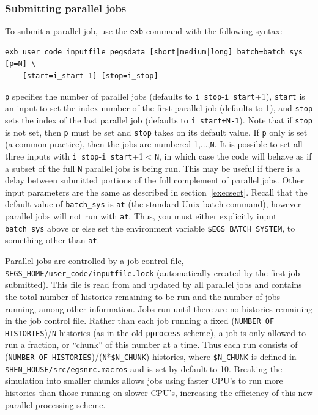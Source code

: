 \documentclass[12pt,twoside]{article}  %
\begin{document}
\subsubsection{Submitting parallel jobs}
\label{subparsect}
To submit a parallel job, use the {\tt exb} command with the following
syntax:
\begin{verbatim}
exb user_code inputfile pegsdata [short|medium|long] batch=batch_sys [p=N] \
    [start=i_start-1] [stop=i_stop]
\end{verbatim}
{\tt p} specifies the number of parallel jobs (defaults to
{\tt i\_stop}-{\tt i\_start}+1), {\tt start} is an input
to set the index number of the
first parallel job (defaults to 1), and {\tt stop} sets the index of the
last parallel
job (defaults to {\tt i\_start+N-1}).  Note that if {\tt stop} is not set,
then {\tt p} must be set and {\tt stop} takes on its default value.  If
{\tt p} only is set (a common practice), then the jobs are numbered
1,...,{\tt N}.  It is possible to set all three inputs with
{\tt i\_stop}-{\tt i\_start}+1$<${\tt N}, in which case the code will
behave as if a subset of the full {\tt N} parallel jobs is being
run.  This may be useful if there is a delay between submitted portions
of the full complement of parallel jobs.
Other input parameters are the same as described in section~\ref{execsect}.
Recall that the default value of {\tt batch\_sys} is {\tt at} (the
standard Unix batch command), however parallel jobs will not run with
{\tt at}.  Thus, you must either explicitly input {\tt batch\_sys} above
or else set the environment variable {\tt \$EGS\_BATCH\_SYSTEM},
to something other than {\tt at}.

Parallel jobs
are controlled by a job control file,
{\tt \$EGS\_HOME/user\_code/inputfile.lock}
(automatically created by the first job submitted).  This file is read from and
updated by all parallel jobs and contains the total number of histories
remaining to be run and the number of jobs running, among other information.
Jobs run until there are no histories remaining in the job control file.
Rather than each job running a fixed ({\tt NUMBER OF HISTORIES})/{\tt N}
histories
(as in the old {\tt pprocess} scheme), a job is only allowed to run
a fraction, or ``chunk'' of this number at a time.  Thus each run
consists of ({\tt NUMBER OF HISTORIES})/({\tt N}*{\tt \$N\_CHUNK})
histories, where
{\tt \$N\_CHUNK} is defined in {\tt \$HEN\_HOUSE/src/egsnrc.macros}
and is set by default to 10.  Breaking the simulation into smaller chunks allows
jobs using faster CPU's to run more histories than those running
on slower CPU's, increasing the efficiency of this new parallel processing
scheme.
\end{document}
